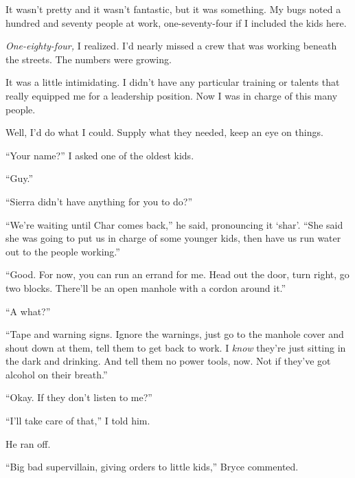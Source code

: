 It wasn't pretty and it wasn't fantastic, but it was something.  My bugs noted a hundred and seventy people at work, one-seventy-four if I included the kids here.



\emph{One-eighty-four, }I realized\emph{. } I'd nearly missed a crew that was working beneath the streets.  The numbers were growing.



It was a little intimidating.  I didn't have any particular training or talents that really equipped me for a leadership position.  Now I was in charge of this many people.



Well, I'd do what I could.  Supply what they needed, keep an eye on things.



``Your name?'' I asked one of the oldest kids.



``Guy.''



``Sierra didn't have anything for you to do?''



``We're waiting until Char comes back,'' he said, pronouncing it `shar'. ``She said she was going to put us in charge of some younger kids, then have us run water out to the people working.''



``Good.  For now, you can run an errand for me.  Head out the door, turn right, go two blocks.  There'll be an open manhole with a cordon around it.''



``A what?''



``Tape and warning signs.  Ignore the warnings, just go to the manhole cover and shout down at them, tell them to get back to work.  I \emph{know} they're just sitting in the dark and drinking.  And tell them no power tools, now.  Not if they've got alcohol on their breath.''



``Okay.  If they don't listen to me?''



``I'll take care of that,'' I told him.



He ran off.



``Big bad supervillain, giving orders to little kids,'' Bryce commented.



